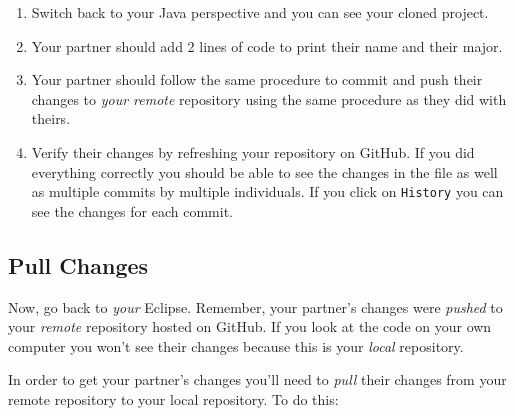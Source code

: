 \documentclass[12pt]{scrartcl}
\begin{document}
\begin{enumerate}
\begin{center}
	\end{center}
  \item Switch back to your Java perspective and you can see your cloned 
  	project.  
  \item Your partner should add 2 lines of code to 
  print their name and their major.
  
  \item Your partner should follow the same procedure to commit 
  and push their changes to \emph{your remote} repository using 
  the same procedure as they did with theirs.
  
  \item Verify their changes by refreshing your repository on
  GitHub.  If you did everything correctly you should be able 
  to see the changes in the file as well as multiple commits by
  multiple individuals.  If you click on \texttt{History} 
  you can see the changes for each commit.

\end{enumerate}

\subsection{Pull Changes}

Now, go back to \emph{your} Eclipse.  Remember, your partner's
changes were \emph{pushed} to your \emph{remote} repository hosted
on GitHub.  If you look at the code on your own computer you 
won't see their changes because this is your \emph{local}
repository.  

In order to get your partner's changes you'll need to \emph{pull}
their changes from your remote repository to your local repository.
To do this: 
\end{document}
